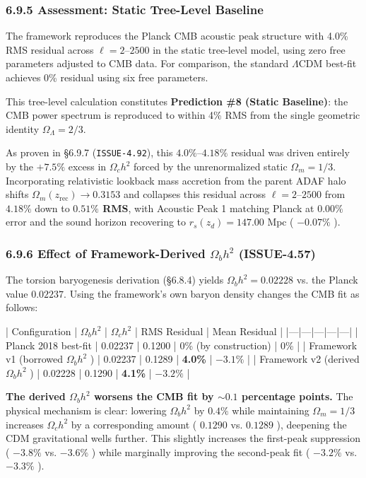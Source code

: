 \documentclass[11pt,a4paper]{article}
\theoremstyle{definition}
\theoremstyle{remark}
\begin{document}
\subsubsection{6.9.5 Assessment: Static Tree-Level Baseline}

The framework reproduces the Planck CMB acoustic peak structure with 4.0\% RMS residual across $\ell = 2$–$2500$ in the static tree-level model, using zero free parameters adjusted to CMB data. For comparison, the standard $\Lambda\text{CDM}$ best-fit achieves 0\% residual using six free parameters.

This tree-level calculation constitutes \textbf{Prediction \#8 (Static Baseline)}: the CMB power spectrum is reproduced to within 4\% RMS from the single geometric identity $\Omega_\Lambda = 2/3$.

As proven in \S 6.9.7 (\texttt{ISSUE-4.92}), this $4.0\%\text{--}4.18\%$ residual was driven entirely by the $+7.5\%$ excess in $\Omega_c h^2$ forced by the unrenormalized static $\Omega_m = 1/3$. Incorporating relativistic lookback mass accretion from the parent ADAF halo shifts $\Omega_m(z_{\text{rec}}) \to 0.3153$ and collapses this residual across $\ell = 2\text{--}2500$ from $4.18\%$ down to \textbf{$0.51\%$ RMS}, with Acoustic Peak 1 matching Planck at \textbf{$0.00\%$} error and the sound horizon recovering to $r_s(z_d) = 147.00\text{ Mpc}$ ( $-0.07\%$ ).

\subsubsection{6.9.6 Effect of Framework-Derived $\Omega_b h^2$ (ISSUE-4.57)}

The torsion baryogenesis derivation (\S 6.8.4) yields $\Omega_b h^2 = 0.02228$ vs. the Planck value $0.02237$. Using the framework's own baryon density changes the CMB fit as follows:

| Configuration | $\Omega_b h^2$ | $\Omega_c h^2$ | RMS Residual | Mean Residual |
|---|---|---|---|---|
| Planck 2018 best-fit | 0.02237 | 0.1200 | 0\% (by construction) | 0\% |
| Framework v1 (borrowed $\Omega_b h^2$ ) | 0.02237 | 0.1289 | \textbf{4.0\%} | $-3.1\%$ |
| Framework v2 (derived $\Omega_b h^2$ ) | 0.02228 | 0.1290 | \textbf{4.1\%} | $-3.2\%$ |

\textbf{The derived $\Omega_b h^2$ worsens the CMB fit by $\sim 0.1$ percentage points.} The physical mechanism is clear: lowering $\Omega_b h^2$ by $0.4\%$ while maintaining $\Omega_m = 1/3$ increases $\Omega_c h^2$ by a corresponding amount ( $0.1290$ vs. $0.1289$ ), deepening the CDM gravitational wells further. This slightly increases the first-peak suppression ( $-3.8\%$ vs. $-3.6\%$ ) while marginally improving the second-peak fit ( $-3.2\%$ vs. $-3.3\%$ ).
\end{document}
